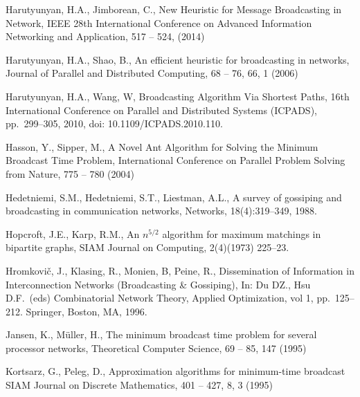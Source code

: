 \documentclass[preprint,12pt, review]{elsarticle}
\begin{document}
\begin{thebibliography}{}
Harutyunyan, H.A., Jimborean, C.,
New Heuristic for Message Broadcasting in Network,
IEEE 28th International Conference on Advanced Information Networking and Application, 517 -- 524, (2014)

Harutyunyan, H.A., Shao, B.,
An efficient heuristic for broadcasting in networks,
Journal of Parallel and Distributed Computing, 68 -- 76, 66, 1 (2006)

Harutyunyan, H.A., Wang, W,
Broadcasting Algorithm Via Shortest Paths, 16th International Conference on Parallel and Distributed Systems (ICPADS), pp.\ 299--305, 2010, doi: 10.1109/ICPADS.2010.110.

Hasson, Y., Sipper, M.,
A Novel Ant Algorithm for Solving the Minimum Broadcast Time Problem,
International Conference on Parallel Problem Solving from Nature, 775 -- 780 (2004)

Hedetniemi, S.M., Hedetniemi, S.T., Liestman, A.L.,
A survey of gossiping and broadcasting in communication networks, Networks, 18(4):319--349, 1988.

Hopcroft, J.E., Karp, R.M.,
An $n^{5/2}$ algorithm for maximum matchings in bipartite graphs, SIAM Journal on Computing, 2(4)(1973) 225--23.

Hromkovi\v{c}, J., Klasing, R., Monien, B, Peine, R.,
Dissemination of Information in Interconnection Networks (Broadcasting \& Gossiping),
In: Du DZ., Hsu D.F.\ (eds) Combinatorial Network Theory, Applied Optimization, vol 1, pp.\ 125--212. Springer, Boston, MA, 1996.


Jansen, K., M\"uller, H.,
The minimum broadcast time problem for several processor networks, 
Theoretical Computer Science, 69 -- 85, 147 (1995)


Kortsarz, G., Peleg, D.,
Approximation algorithms for minimum-time broadcast
SIAM Journal on Discrete Mathematics, 401 -- 427, 8, 3 (1995)


\end{thebibliography}
\end{document}
